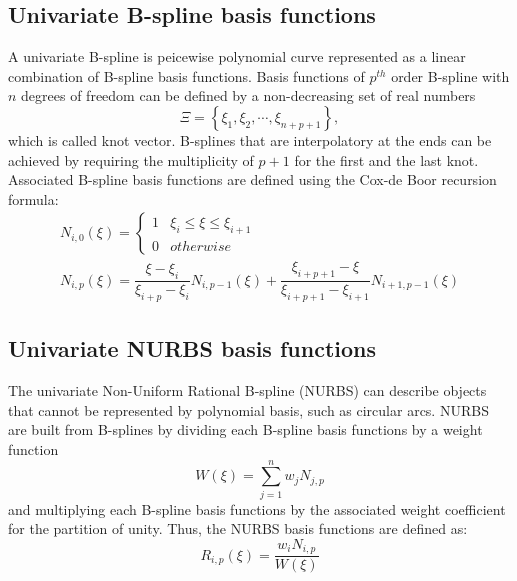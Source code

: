 \documentclass[preprint,12pt]{elsarticle}
\begin{document}
\subsection{Univariate B-spline basis functions}
A univariate B-spline is peicewise polynomial curve represented as a linear combination of B-spline basis functions. Basis functions of $p^{th}$ order B-spline with $n$ degrees of freedom can be defined by a non-decreasing set of real numbers
\begin{equation}
\Xi = \left\{{\xi_1,\xi_2,\cdots,\xi_{n+p+1}}\right\},
\end{equation}
which is called knot vector. B-splines that are interpolatory at the ends can be achieved by requiring the multiplicity of $p+1$ for the first and the last knot. Associated B-spline basis functions are defined using the Cox-de Boor recursion formula:
\begin{gather}
N_{i,0}(\xi)=\begin{cases}1 & \xi_i\leq{\xi}\leq{\xi_{i+1}}\\0 & otherwise \end{cases} \\
N_{i,p}(\xi)=\dfrac{\xi-\xi_i}{\xi_{i+p}-\xi_i}N_{i,p-1}(\xi)+\dfrac{\xi_{i+p+1}-\xi}{\xi_{i+p+1}-\xi_{i+1}}N_{i+1,p-1}(\xi)
\end{gather}
\subsection{Univariate NURBS basis functions}
The univariate Non-Uniform Rational B-spline (NURBS) can describe objects that cannot be represented by polynomial basis, such as circular arcs. NURBS are built from B-splines by dividing each B-spline basis functions by a weight function
\begin{equation}
W(\xi)=\sum_{j=1}^n w_jN_{j,p}
\end{equation}
and multiplying each B-spline basis functions by the associated weight coefficient for the partition of unity. Thus, the NURBS basis functions are defined as:
\begin{equation}
R_{i,p}(\xi)=\dfrac{w_iN_{i,p}}{W(\xi)}
\end{equation}
\end{document}
